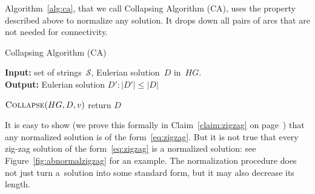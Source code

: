 Algorithm~\ref{alg:ca}, that we call Collapsing Algorithm (CA), uses the property described above to normalize any solution.
It drops down all pairs of arcs that are not needed for connectivity.



\begin{algorithm}[!ht]
\caption{Collapsing Algorithm (CA)}
\label{alg:ca}
\hspace*{\algorithmicindent} \textbf{Input:} set of strings~$\mathcal{S}$, Eulerian solution~$D$ in~$HG$.\\
\hspace*{\algorithmicindent} \textbf{Output:} Eulerian solution $D'\colon |D'|\leq|D|$
\begin{algorithmic}[1]
\label{alg:ca_for}
\State $\text{\sc Collapse}(HG, D, v)$
\EndWhile
\EndFor
\EndFor
\State return $D$
\end{algorithmic}
\end{algorithm}

It is easy to show (we prove this formally in Claim~\ref{claim:zigzag} on page~\pageref{claim:zigzag}) that any normalized solution is of the form~\eqref{eq:zigzag}. But it is not true that every zig-zag solution of the form~\eqref{eq:zigzag} is a normalized solution: see Figure~\ref{fig:abnormalzigzag} for an example. The normalization procedure does not just turn a~solution into some standard form, but it may also decrease its length.

